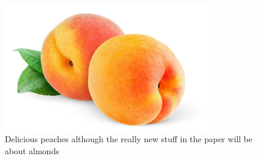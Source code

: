 \documentclass[12pt]{article}
\begin{document}
\begin{figure}[b]
\centering
   \includegraphics[width=0.8\textwidth]{peachzdfgad.jpg}
  \caption{Delicious peaches although the really new stuff in the paper will be about almonds}
  \label{fig:peach}
\end{figure}
%
\pagebreak
\end{document}
